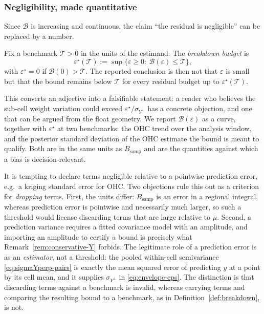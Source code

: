 \subsubsection*{Negligibility, made quantitative}
\label{sec:breakdown}

Since $\mathcal{B}$ is increasing and continuous, the claim ``the
residual is negligible'' can be replaced by a number.

\begin{definition}
\label{def:breakdown}
Fix a benchmark $\mathcal{T}>0$ in the units of the estimand. The
\emph{breakdown budget} is
\[
  \varepsilon^{\star}(\mathcal{T})
  :=\sup\{\varepsilon\ge0:\ \mathcal{B}(\varepsilon)\le\mathcal{T}\},
\]
with $\varepsilon^{\star}=0$ if $\mathcal{B}(0)>\mathcal{T}$. The
reported conclusion is then not that $\varepsilon$ is small but that the
bound remains below $\mathcal{T}$ for every residual budget up to
$\varepsilon^{\star}(\mathcal{T})$.
\end{definition}

This converts an adjective into a falsifiable statement: a reader who
believes the sub-cell weight variation could exceed
$\varepsilon^{\star}/\sigma_{Y^{\perp}}$ has a concrete objection, and
one that can be argued from the float geometry. We report
$\mathcal{B}(\varepsilon)$ as a curve, together with
$\varepsilon^{\star}$ at two benchmarks: the OHC trend over the analysis
window, and the posterior standard deviation of the OHC estimate the
bound is meant to qualify. Both are in the same units as
$B_{\mathrm{samp}}$ and are the quantities against which a bias is
decision-relevant.

\begin{remark}
\label{rem:pred-benchmark}
It is tempting to declare terms negligible relative to a pointwise
prediction error, e.g.\ a kriging standard error for OHC. Two objections
rule this out as a criterion for \emph{dropping} terms. First, the units
differ: $B_{\mathrm{samp}}$ is an error in a regional integral, whereas
prediction error is pointwise and necessarily much larger, so such a
threshold would license discarding terms that are large relative to
$\mu$. Second, a prediction variance requires a fitted covariance model
with an amplitude, and importing an amplitude to certify a bound is
precisely what Remark~\ref{rem:conservative-Y} forbids. The legitimate
role of a prediction error is as an \emph{estimator}, not a threshold:
the pooled within-cell semivariance \eqref{eq:sigmaYperp-pairs} is
exactly the mean squared error of predicting $y$ at a point by its cell
mean, and it supplies $\sigma_{Y^{\perp}}$ in \eqref{eq:envelope-eps}.
The distinction is that discarding terms against a benchmark is invalid,
whereas carrying terms and comparing the resulting bound to a benchmark,
as in Definition~\ref{def:breakdown}, is not.
\end{remark}

